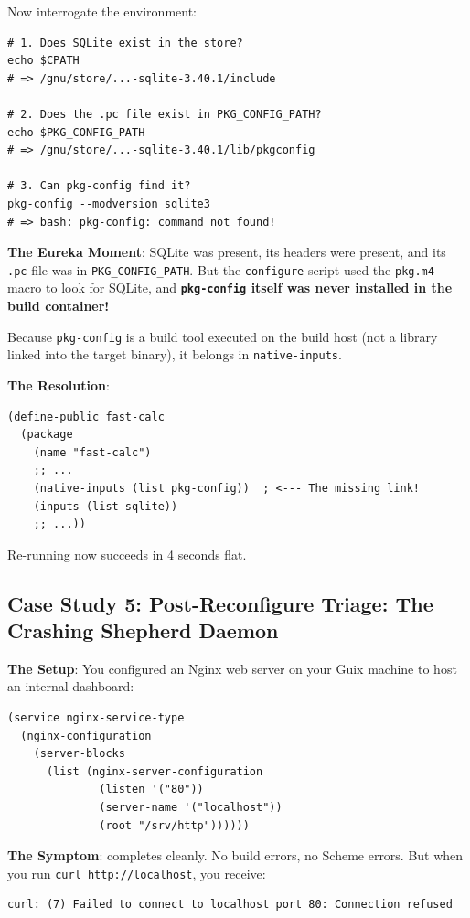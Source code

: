 Now interrogate the environment:
\begin{lstlisting}[style=guixcli]
# 1. Does SQLite exist in the store?
echo $CPATH
# => /gnu/store/...-sqlite-3.40.1/include

# 2. Does the .pc file exist in PKG_CONFIG_PATH?
echo $PKG_CONFIG_PATH
# => /gnu/store/...-sqlite-3.40.1/lib/pkgconfig

# 3. Can pkg-config find it?
pkg-config --modversion sqlite3
# => bash: pkg-config: command not found!
\end{lstlisting}

\textbf{The Eureka Moment}: SQLite was present, its headers were present, and its \texttt{.pc} file was in \texttt{PKG\_CONFIG\_PATH}. But the \texttt{configure} script used the \texttt{pkg.m4} macro to look for SQLite, and \textbf{\texttt{pkg-config} itself was never installed in the build container!}

Because \texttt{pkg-config} is a build tool executed on the build host (not a library linked into the target binary), it belongs in \texttt{native-inputs}.

\textbf{The Resolution}:
\begin{lstlisting}[style=guixscheme]
(define-public fast-calc
  (package
    (name "fast-calc")
    ;; ...
    (native-inputs (list pkg-config))  ; <--- The missing link!
    (inputs (list sqlite))
    ;; ...))
\end{lstlisting}
Re-running  now succeeds in 4 seconds flat.

\subsection{Case Study 5: Post-Reconfigure Triage: The Crashing Shepherd Daemon}

\textbf{The Setup}: You configured an Nginx web server on your Guix machine to host an internal dashboard:

\begin{lstlisting}[style=guixscheme]
(service nginx-service-type
  (nginx-configuration
    (server-blocks
      (list (nginx-server-configuration
              (listen '("80"))
              (server-name '("localhost"))
              (root "/srv/http"))))))
\end{lstlisting}

\textbf{The Symptom}:  completes cleanly. No build errors, no Scheme errors. But when you run \texttt{curl http://localhost}, you receive:
\begin{lstlisting}[style=guixcli]
curl: (7) Failed to connect to localhost port 80: Connection refused
\end{lstlisting}

